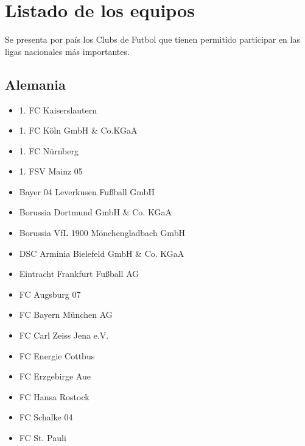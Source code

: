 \chapter{Listado de los equipos}\label{chap:equipos}
Se presenta por país los Clubs de Futbol que tienen permitido participar en las ligas nacionales más importantes.
\section{Alemania}\label{sec:equipos-ger}
\begin{multicols}{2}
	\begin{itemize}
	    \setlength{\itemsep}{1pt}
	    \setlength{\parskip}{0pt}
	    \setlength{\parsep}{0pt}

		\item 1. FC Kaiserslautern

		\item 1. FC Köln GmbH \& Co.KGaA

		\item 1. FC Nürnberg

		\item 1. FSV Mainz 05

		\item Bayer 04 Leverkusen Fußball GmbH

		\item Borussia Dortmund GmbH \& Co. KGaA

		\item Borussia VfL 1900 Mönchengladbach GmbH

		\item DSC Arminia Bielefeld GmbH \& Co. KGaA

		\item Eintracht Frankfurt Fußball AG

		\item FC Augsburg 07

		\item FC Bayern München AG

		\item FC Carl Zeiss Jena e.V.

		\item FC Energie Cottbus

		\item FC Erzgebirge Aue

		\item FC Hansa Rostock

		\item FC Schalke 04

		\item FC St. Pauli


\end{itemize}
\end{multicols}
